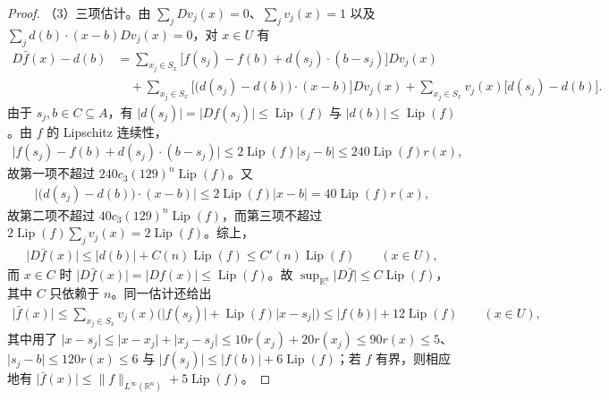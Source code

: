 \documentclass[../../main.tex]{subfiles}%
\begin{document}
\begin{proof}
（3）三项估计。由 $\sum_jDv_j(x)=0$、$\sum_jv_j(x)=1$ 以及 $\sum_jd(b)\cdot(x-b)Dv_j(x)=0$，对 $x\in U$ 有
\begin{align*}
D\bar f(x)-d(b)&=\sum_{x_j\in S_x}\bigl[f(s_j)-f(b)+d(s_j)\cdot(b-s_j)\bigr]Dv_j(x)\\
&\quad+\sum_{x_j\in S_x}\bigl[\bigl(d(s_j)-d(b)\bigr)\cdot(x-b)\bigr]Dv_j(x)+\sum_{x_j\in S_x}v_j(x)\bigl[d(s_j)-d(b)\bigr].
\end{align*}
由于 $s_j,b\in C\subseteq A$，有 $\lvert d(s_j)\rvert=\lvert Df(s_j)\rvert\le\operatorname{Lip}(f)$ 与 $\lvert d(b)\rvert\le\operatorname{Lip}(f)$。由 $f$ 的 Lipschitz 连续性，
\begin{align*}
\bigl\lvert f(s_j)-f(b)+d(s_j)\cdot(b-s_j)\bigr\rvert\le2\operatorname{Lip}(f)\lvert s_j-b\rvert\le240\operatorname{Lip}(f)r(x),
\end{align*}
故第一项不超过 $240c_3(129)^n\operatorname{Lip}(f)$。又
\begin{align*}
\bigl\lvert\bigl(d(s_j)-d(b)\bigr)\cdot(x-b)\bigr\rvert\le2\operatorname{Lip}(f)\lvert x-b\rvert=40\operatorname{Lip}(f)r(x),
\end{align*}
故第二项不超过 $40c_3(129)^n\operatorname{Lip}(f)$，而第三项不超过 $2\operatorname{Lip}(f)\sum_jv_j(x)=2\operatorname{Lip}(f)$。综上，
\begin{align*}
\lvert D\bar f(x)\rvert\le\lvert d(b)\rvert+C(n)\operatorname{Lip}(f)\le C'(n)\operatorname{Lip}(f)\qquad(x\in U),
\end{align*}
而 $x\in C$ 时 $\lvert D\bar f(x)\rvert=\lvert Df(x)\rvert\le\operatorname{Lip}(f)$。故 $\sup_{\mathbb{R}^n}\lvert D\bar f\rvert\le C\operatorname{Lip}(f)$，其中 $C$ 只依赖于 $n$。同一估计还给出
\begin{align*}
\lvert\bar f(x)\rvert\le\sum_{x_j\in S_x}v_j(x)\bigl(\lvert f(s_j)\rvert+\operatorname{Lip}(f)\lvert x-s_j\rvert\bigr)\le\lvert f(b)\rvert+12\operatorname{Lip}(f)\qquad(x\in U),
\end{align*}
其中用了 $\lvert x-s_j\rvert\le\lvert x-x_j\rvert+\lvert x_j-s_j\rvert\le10r(x_j)+20r(x_j)\le90r(x)\le5$、$\lvert s_j-b\rvert\le120r(x)\le6$ 与 $\lvert f(s_j)\rvert\le\lvert f(b)\rvert+6\operatorname{Lip}(f)$；若 $f$ 有界，则相应地有 $\lvert\bar f(x)\rvert\le\lVert f\rVert_{L^{\infty}(\mathbb{R}^n)}+5\operatorname{Lip}(f)$。
\end{proof}
\end{document}
